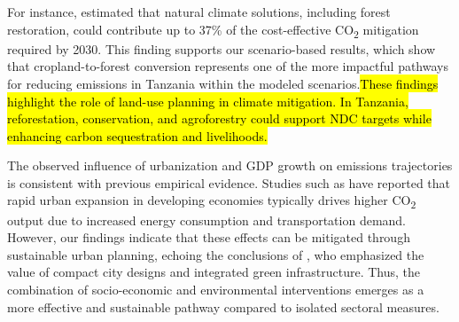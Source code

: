 \documentclass[10pt,letterpaper]{article}
\begin{document}
 For instance, \cite{griscom2017natural} estimated that natural climate solutions, including forest restoration, could contribute up to 37\% of the cost-effective CO\textsubscript{2} mitigation required by 2030. This finding supports our scenario-based results, which show that cropland-to-forest conversion represents one of the more impactful pathways for reducing emissions in Tanzania within the modeled scenarios.\hl{These findings highlight the role of land-use planning in climate mitigation. In Tanzania, reforestation, conservation, and agroforestry could support NDC targets while enhancing carbon sequestration and livelihoods.}

The observed influence of urbanization and GDP growth on emissions trajectories is consistent with previous empirical evidence. Studies such as \cite{sun2022impacts, wang2019nexus} have reported that rapid urban expansion in developing economies typically drives higher CO\textsubscript{2} output due to increased energy consumption and transportation demand. However, our findings indicate that these effects can be mitigated through sustainable urban planning, echoing the conclusions of \cite{artmann2019smart}, who emphasized the value of compact city designs and integrated green infrastructure. Thus, the combination of socio-economic and environmental interventions emerges as a more effective and sustainable pathway compared to isolated sectoral measures.
\end{document}
